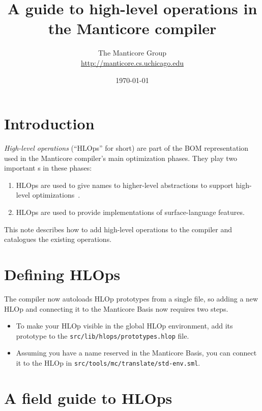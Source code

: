 \documentclass[11pt]{article}
\title{A guide to high-level operations in the Manticore compiler}
\author{The Manticore Group \\
  {\small{}\url{http://manticore.cs.uchicago.edu}}}
\date{\today}
\begin{document}
\maketitle

\section{Introduction}
\emph{High-level operations} (``HLOps'' for short) are part of the BOM representation used
in the Manticore compiler's main optimization phases.
They play two important \role{}s in these phases:
\begin{enumerate}
  \item HLOps are used to give names to higher-level abstractions to support high-level
    optimizations~\cite{playing-by-the-rules,optimizing-cml}.
  \item HLOps are used to provide implementations of surface-language features.
\end{enumerate}%
This note describes how to add high-level operations to the compiler and
catalogues the existing operations.

\section{Defining HLOps}
The compiler now autoloads HLOp prototypes from a single file, so adding a new HLOp and connecting 
it to the Manticore Basis now requires two steps.
\begin{itemize}
  \item To make your HLOp visible in the global HLOp environment, add its prototype to
    the {\tt src/lib/hlops/prototypes.hlop} file.
  \item Assuming you have a name reserved in the Manticore Basis, you can connect it to the HLOp
    in {\tt src/tools/mc/translate/std-env.sml}.
\end{itemize}

\section{A field guide to HLOps}
\end{document}
